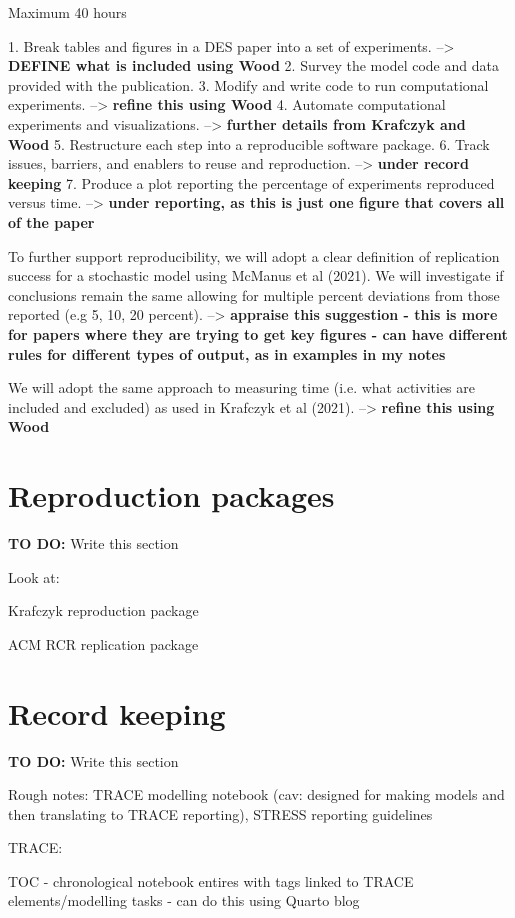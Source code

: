 Maximum 40 hours

1. Break tables and figures in a DES paper into a set of experiments. --> \textbf{DEFINE what is included using Wood}
2. Survey the model code and data provided with the publication. 
3. Modify and write code to run computational experiments. --> \textbf{refine this using Wood}
4. Automate computational experiments and visualizations. --> \textbf{further details from Krafczyk and Wood}
5. Restructure each step into a reproducible software package.
6. Track issues, barriers, and enablers to reuse and reproduction. --> \textbf{under record keeping}
7. Produce a plot reporting the percentage of experiments reproduced versus time. --> \textbf{under reporting, as this is just one figure that covers all of the paper}

To further support reproducibility, we will adopt a clear definition of replication success for a stochastic model using McManus et al (2021). We will investigate if conclusions remain the same allowing for multiple percent deviations from those reported (e.g 5, 10, 20 percent). --> \textbf{appraise this suggestion - this is more for papers where they are trying to get key figures - can have different rules for different types of output, as in examples in my notes}

We will adopt the same approach to measuring time (i.e. what activities are included and excluded) as used in Krafczyk et al (2021). --> \textbf{refine this using Wood}

\section{Reproduction packages}

\textbf{TO DO:} Write this section

Look at:

Krafczyk reproduction package

ACM RCR replication package


\section{Record keeping}

\textbf{TO DO:} Write this section

Rough notes: TRACE modelling notebook (cav: designed for making models and then translating to TRACE reporting), STRESS reporting guidelines

TRACE:

TOC - chronological notebook entires with tags linked to TRACE elements/modelling tasks - can do this using Quarto blog

